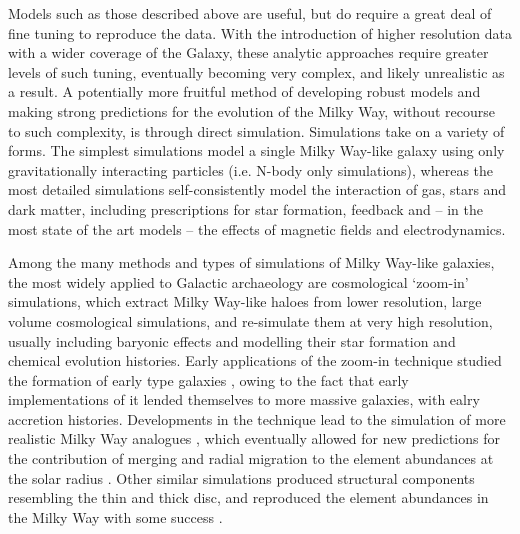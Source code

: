  Models such as those described above are useful, but do require a great deal of fine tuning to reproduce the data. With the introduction of higher resolution data with a wider coverage of the Galaxy, these analytic approaches require greater levels of such tuning, eventually becoming very complex, and likely unrealistic as a result. A potentially more fruitful method of developing robust models and making strong predictions for the evolution of the Milky Way, without recourse to such complexity, is through direct simulation. Simulations take on a variety of forms. The simplest simulations model a single Milky Way-like galaxy using only gravitationally interacting particles (i.e. N-body only simulations),  whereas the most detailed simulations self-consistently model the interaction of gas, stars and dark matter, including prescriptions for star formation, feedback and -- in the most state of the art models -- the effects of magnetic fields and electrodynamics.
 
 Among the many methods and types of simulations of Milky Way-like galaxies, the most widely applied to Galactic archaeology are cosmological `zoom-in' simulations, which extract Milky Way-like haloes from lower resolution, large volume cosmological simulations, and re-simulate them at very high resolution, usually including baryonic effects and modelling their star formation and chemical evolution histories. Early applications of the zoom-in technique studied the formation of early type galaxies \citep[e.g.][]{1993ApJ...412..455K}, owing to the fact that early implementations of it lended themselves to more massive galaxies, with ealry accretion histories. Developments in the technique \citep[such as those described in][alongside those in the sub-grid models, as described earlier]{2009ApJ...707..250M} lead to the simulation of more realistic Milky Way analogues \citep[e.g.][]{2012ApJ...756...26M}, which eventually allowed for new predictions for the contribution of merging and radial migration to the element abundances at the solar radius \citep[e.g.][]{2013A&A...558A...9M,2014A&A...572A..92M}. Other similar simulations produced structural components resembling the thin and thick disc, and reproduced the element abundances in the Milky Way with some success \citep{2012MNRAS.426..690B}. 
 
